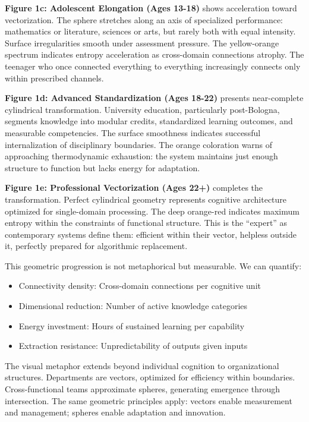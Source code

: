 \textbf{Figure 1c: Adolescent Elongation (Ages 13-18)} shows acceleration toward vectorization. The sphere stretches along an axis of specialized performance: mathematics or literature, sciences or arts, but rarely both with equal intensity. Surface irregularities smooth under assessment pressure. The yellow-orange spectrum indicates entropy acceleration as cross-domain connections atrophy. The teenager who once connected everything to everything increasingly connects only within prescribed channels.

\textbf{Figure 1d: Advanced Standardization (Ages 18-22)} presents near-complete cylindrical transformation. University education, particularly post-Bologna, segments knowledge into modular credits, standardized learning outcomes, and measurable competencies. The surface smoothness indicates successful internalization of disciplinary boundaries. The orange coloration warns of approaching thermodynamic exhaustion: the system maintains just enough structure to function but lacks energy for adaptation.

\textbf{Figure 1e: Professional Vectorization (Ages 22+)} completes the transformation. Perfect cylindrical geometry represents cognitive architecture optimized for single-domain processing. The deep orange-red indicates maximum entropy within the constraints of functional structure. This is the ``expert'' as contemporary systems define them: efficient within their vector, helpless outside it, perfectly prepared for algorithmic replacement.

This geometric progression is not metaphorical but measurable. We can quantify:
\begin{itemize}
\item Connectivity density: Cross-domain connections per cognitive unit
\item Dimensional reduction: Number of active knowledge categories
\item Energy investment: Hours of sustained learning per capability
\item Extraction resistance: Unpredictability of outputs given inputs
\end{itemize}

The visual metaphor extends beyond individual cognition to organizational structures. Departments are vectors, optimized for efficiency within boundaries. Cross-functional teams approximate spheres, generating emergence through intersection. The same geometric principles apply: vectors enable measurement and management; spheres enable adaptation and innovation.

